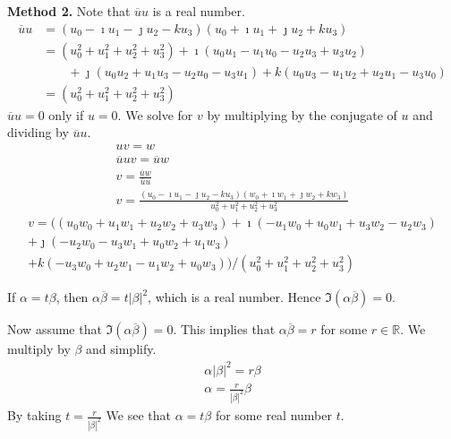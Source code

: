 {\begin{Solution}
  \textbf{Method 2.}
  Note that $\overline{u} u$ is a real number.
  \begin{align*}
    \overline{u} u
    &= \left( u_0 - \imath u_1 - \jmath u_2 - k u_3 \right)  
    \left( u_0 + \imath u_1 + \jmath u_2 + k u_3 \right) 
    \\
    &= \left( u_0^2 + u_1^2 + u_2^2 + u_3^2 \right)
    + \imath \left( u_0 u_1 - u_1 u_0 - u_2 u_3 + u_3 u_2 \right) 
    \\
    &\qquad + \jmath \left( u_0 u_2 + u_1 u_3 - u_2 u_0 - u_3 u_1 \right)
    + k \left( u_0 u_3 - u_1 u_2 + u_2 u_1 - u_3 u_0 \right) 
    \\
    &= \left( u_0^2 + u_1^2 + u_2^2 + u_3^2 \right)
  \end{align*}
  $\overline{u} u = 0$ only if $u = 0$.  We solve for $v$ by multiplying 
  by the conjugate of $u$ and dividing by $\overline{u} u$.
  \begin{gather*}
    u v = w 
    \\
    \overline{u} u v = \overline{u} w 
    \\
    v = \frac{\overline{u} w}{\overline{u} u} 
    \\
    v = \frac{ \left( u_0 - \imath u_1 - \jmath u_2 - k u_3 \right)  
      \left( w_0 + \imath w_1 + \jmath w_2 + k w_3 \right) }
    { u_0^2 + u_1^2 + u_2^2 + u_3^2 } 
  \end{gather*}
  \begin{multline*}
    v = \big( \left( u_0 w_0 + u_1 w_1 + u_2 w_2 + u_3 w_3 \right)
    + \imath \left( - u_1 w_0 + u_0 w_1 + u_3 w_2 - u_2 w_3 \right)
    \\
    + \jmath \left( - u_2 w_0 - u_3 w_1 + u_0 w_2 + u_1 w_3 \right) 
    \\
    + k \left( - u_3 w_0 + u_2 w_1 - u_1 w_2 + u_0 w_3 \right) \big) / 
    \left( u_0^2 + u_1^2 + u_2^2 + u_3^2 \right)
  \end{multline*}
\end{Solution}






\begin{Solution}
  \label{solution alpha = t beta}
  If $\alpha = t \beta$, then $\alpha \overline{\beta} = t | \beta |^2$, which is a real number.
  Hence $\Im\left( \alpha \overline{\beta} \right) = 0$.

  Now assume that $\Im\left( \alpha \overline{\beta} \right) = 0$.  This implies that 
  $\alpha \overline{\beta} = r$ for some $r \in \mathbb{R}$.  We multiply by $\beta$
  and simplify.
  \begin{gather*}
    \alpha |\beta|^2 = r \beta \\
    \alpha = \frac{r}{|\beta|^2} \beta
  \end{gather*}
  By taking $t = \frac{r}{|\beta|^2}$ We see that $\alpha = t \beta$ for some real 
  number $t$.
\end{Solution}




}
